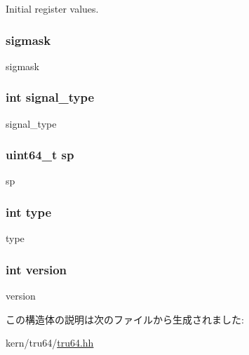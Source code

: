 Initial register values. \hypertarget{structTru64_1_1nxm__thread__attr_a84a273d642c19957017a87b1f54031e6}{
\subsubsection[{sigmask}]{ {\bf sigmask}}}
\label{structTru64_1_1nxm__thread__attr_a84a273d642c19957017a87b1f54031e6}
sigmask \hypertarget{structTru64_1_1nxm__thread__attr_a83a847385a7ebdc5a054dd0e1ab6f0e9}{
\subsubsection[{signal\_\-type}]{\setlength{\rightskip}{0pt plus 5cm}int {\bf signal\_\-type}}}
\label{structTru64_1_1nxm__thread__attr_a83a847385a7ebdc5a054dd0e1ab6f0e9}


signal\_\-type \hypertarget{structTru64_1_1nxm__thread__attr_acd6941efd501803089091f06f1967f7d}{
\subsubsection[{sp}]{\setlength{\rightskip}{0pt plus 5cm}uint64\_\-t {\bf sp}}}
\label{structTru64_1_1nxm__thread__attr_acd6941efd501803089091f06f1967f7d}


sp \hypertarget{structTru64_1_1nxm__thread__attr_ac765329451135abec74c45e1897abf26}{
\subsubsection[{type}]{\setlength{\rightskip}{0pt plus 5cm}int {\bf type}}}
\label{structTru64_1_1nxm__thread__attr_ac765329451135abec74c45e1897abf26}


type \hypertarget{structTru64_1_1nxm__thread__attr_aad880fc4455c253781e8968f2239d56f}{
\subsubsection[{version}]{\setlength{\rightskip}{0pt plus 5cm}int {\bf version}}}
\label{structTru64_1_1nxm__thread__attr_aad880fc4455c253781e8968f2239d56f}


version 

この構造体の説明は次のファイルから生成されました:\begin{DoxyCompactItemize}
\item 
kern/tru64/\hyperlink{kern_2tru64_2tru64_8hh}{tru64.hh}\end{DoxyCompactItemize}

